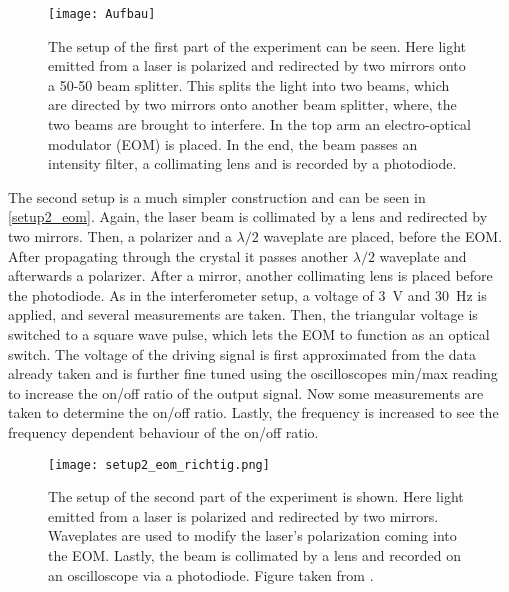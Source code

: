 \begin{figure}[H]
	\centering
	\texttt{[image: Aufbau]}
	\caption{The setup of the first part of the experiment can be seen. Here light emitted from a  laser is polarized and redirected by two mirrors onto a 50-50 beam splitter. This splits the light into two beams, which are directed by two mirrors onto another beam splitter, where, the two beams are brought to interfere. In the top arm an electro-optical modulator (EOM) is placed. In the end, the beam passes an intensity filter, a collimating lens and is recorded by a photodiode.}
	\label{ExperimetAufbau_mach_zehnder}
\end{figure}
The second setup is a much simpler construction and can be seen in \autoref{setup2_eom}. Again, the  laser beam is collimated by a lens and redirected by two mirrors. Then, a polarizer and a $\lambda/2$ waveplate are placed, before the EOM. After propagating through the crystal it passes another $\lambda/2$ waveplate and afterwards a polarizer. After a mirror, another collimating lens is placed before the photodiode. As in the interferometer setup, a voltage of \SI{3}{V} and \SI{30}{Hz} is applied, and several measurements are taken. Then, the triangular voltage is switched to a square wave pulse, which lets the EOM to function as an optical switch. The voltage of the driving signal is first approximated from the data already taken and is further fine tuned using the oscilloscopes min/max reading to increase the on/off ratio of the output signal. Now some measurements are taken to determine the on/off ratio. Lastly, the frequency is increased to see the frequency dependent behaviour of the on/off ratio. 

\begin{figure}[H]
	\centering
	\texttt{[image: setup2\_eom\_richtig.png]}
	\caption{The setup of the second part of the experiment is shown. Here light emitted from a  laser is polarized and redirected by two mirrors. Waveplates are used to modify the laser's polarization coming into the EOM. Lastly, the beam is collimated by a lens and recorded on an oscilloscope via a photodiode. Figure taken from \autocite{eom}.}
	\label{setup2_eom}
\end{figure}




